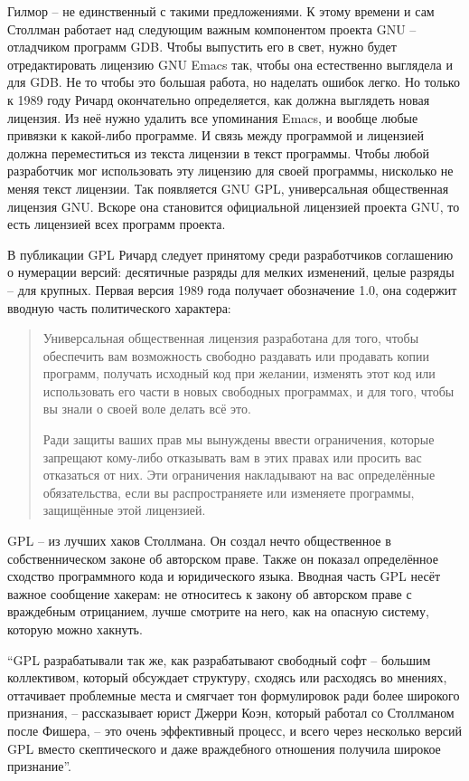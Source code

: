 Гилмор -- не единственный с такими предложениями. К этому времени и сам Столлман работает над следующим важным компонентом проекта GNU -- отладчиком программ GDB. Чтобы выпустить его в свет, нужно будет отредактировать лицензию GNU Emacs так, чтобы она естественно выглядела и для GDB. Не то чтобы это большая работа, но наделать ошибок легко. Но только к 1989 году Ричард окончательно определяется, как должна выглядеть новая лицензия. Из неё нужно удалить все упоминания Emacs, и вообще любые привязки к какой-либо программе. И связь между программой и лицензией должна переместиться из текста лицензии в текст программы. Чтобы любой разработчик мог использовать эту лицензию для своей программы, нисколько не меняя текст лицензии. Так появляется GNU GPL, универсальная общественная лицензия GNU. Вскоре она становится официальной лицензией проекта GNU, то есть лицензией всех программ проекта.

В публикации GPL Ричард следует принятому среди разработчиков соглашению о нумерации версий: десятичные разряды для мелких изменений, целые разряды -- для крупных. Первая версия 1989 года получает обозначение 1.0, она содержит вводную часть политического характера:

\begin{quote}
Универсальная общественная лицензия разработана для того, чтобы обеспечить вам возможность свободно раздавать или продавать копии программ, получать исходный код при желании, изменять этот код или использовать его части в новых свободных программах, и для того, чтобы вы знали о своей воле делать всё это.

Ради защиты ваших прав мы вынуждены ввести ограничения, которые запрещают кому-либо отказывать вам в этих правах или просить вас отказаться от них. Эти ограничения накладывают на вас определённые обязательства, если вы распространяете или изменяете программы, защищённые этой лицензией.
\end{quote}

GPL -- из лучших хаков Столлмана. Он создал нечто общественное в собственническом законе об авторском праве. Также он показал определённое сходство программного кода и юридического языка. Вводная часть GPL несёт важное сообщение хакерам: не относитесь к закону об авторском праве с враждебным отрицанием, лучше смотрите на него, как на опасную систему, которую можно хакнуть.

\enquote{GPL разрабатывали так же, как разрабатывают свободный софт -- большим коллективом, который обсуждает структуру, сходясь или расходясь во мнениях, оттачивает проблемные места и смягчает тон формулировок ради более широкого признания, -- рассказывает юрист Джерри Коэн, который работал со Столлманом после Фишера, -- это очень эффективный процесс, и всего через несколько версий GPL вместо скептического и даже враждебного отношения получила широкое признание}.

